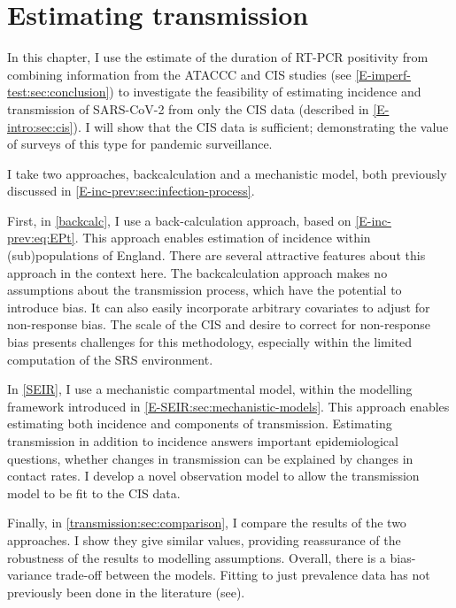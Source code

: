 \documentclass[thesis.tex]{subfiles}
\begin{document}
\ifSubfilesClassLoaded{
    \setcounter{chapter}{6}
}

\chapter{Estimating transmission} \label{transmission}

In this chapter, I use the estimate of the duration of RT-PCR positivity from combining information from the ATACCC and CIS studies (see \cref{E-imperf-test:sec:conclusion}) to investigate the feasibility of estimating incidence and transmission of SARS-CoV-2 from only the CIS data (described in \cref{E-intro:sec:cis}).
I will show that the CIS data is sufficient; demonstrating the value of surveys of this type for pandemic surveillance.

I take two approaches, backcalculation and a mechanistic model, both previously discussed in \cref{E-inc-prev:sec:infection-process}.

First, in \cref{backcalc}, I use a back-calculation approach, based on \cref{E-inc-prev:eq:EPt}.
This approach enables estimation of incidence within (sub)populations of England.
There are several attractive features about this approach in the context here.
The backcalculation approach makes no assumptions about the transmission process, which have the potential to introduce bias.
It can also easily incorporate arbitrary covariates to adjust for non-response bias.
The scale of the CIS and desire to correct for non-response bias presents challenges for this methodology, especially within the limited computation of the SRS environment.

In \cref{SEIR}, I use a mechanistic compartmental model, within the modelling framework introduced in \cref{E-SEIR:sec:mechanistic-models}.
This approach enables estimating both incidence and components of transmission.
Estimating transmission in addition to incidence answers important epidemiological questions, \eg whether changes in transmission can be explained by changes in contact rates.
I develop a novel observation model to allow the transmission model to be fit to the CIS data.

Finally, in \cref{transmission:sec:comparison}, I compare the results of the two approaches.
I show they give similar values, providing reassurance of the robustness of the results to modelling assumptions.
Overall, there is a bias-variance trade-off between the models.
Fitting to just prevalence data has not previously been done in the literature (see).
\end{document}
